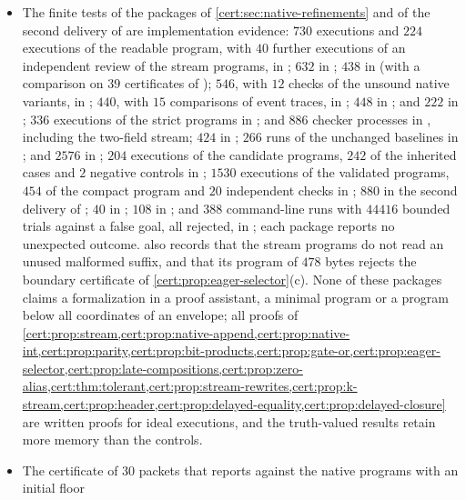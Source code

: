 \begin{itemize}
belong to the chapter on canonical and counter-aware recursors; this chapter
records only its size.
\item The finite tests of the packages of \cref{cert:sec:native-refinements}
and of the second delivery of  are implementation
evidence: $730$ executions and $224$ executions of the readable program, with
$40$ further executions of an independent review of the stream programs, in
; $632$ in ; $438$ in
 (with a comparison on $39$ certificates of
); $546$, with $12$ checks of the unsound native
variants, in ; $440$, with $15$ comparisons of event
traces, in ; $448$ in ;
and $222$ in ; $336$ executions of the strict programs in
; and $886$ checker processes in ,
including the two-field stream; $424$ in ; $266$ runs
of the unchanged baselines in ; and $2576$ in
; $204$ executions of the candidate programs, $242$ of
the inherited cases and $2$ negative controls in ; $1530$
executions of the validated programs, $454$ of the compact program and $20$
independent checks in ; $880$ in the second delivery of
; $40$ in ; $108$ in ; and
$388$ command-line runs with $44416$ bounded trials against a false goal, all
rejected, in ; each package reports no unexpected
outcome.
 also records that the stream programs do not read an
unused malformed suffix, and that its program of $478$ bytes rejects the
boundary certificate of \cref{cert:prop:eager-selector}(c). None of these packages claims a formalization in a
proof assistant, a minimal program or a program below all coordinates of an
envelope; all proofs of \cref{cert:prop:stream,cert:prop:native-append,cert:prop:native-int,cert:prop:parity,cert:prop:bit-products,cert:prop:gate-or,cert:prop:eager-selector,cert:prop:late-compositions,cert:prop:zero-alias,cert:thm:tolerant,cert:prop:stream-rewrites,cert:prop:k-stream,cert:prop:header,cert:prop:delayed-equality,cert:prop:delayed-closure}
are written proofs for ideal executions, and the truth-valued results retain
more memory than the controls.
\item The certificate of $30$ packets that  reports
against the native programs with an initial floor

\end{itemize}
